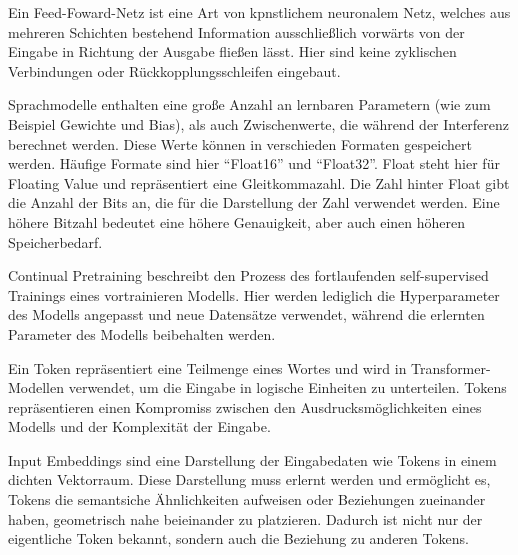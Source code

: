 \begin{definition}\label{def:feed-forward-netz}
    Ein Feed-Foward-Netz ist eine Art von kpnstlichem neuronalem Netz, welches aus mehreren Schichten bestehend Information ausschließlich vorwärts von der Eingabe
    in Richtung der Ausgabe fließen lässt. Hier sind keine zyklischen Verbindungen oder Rückkopplungsschleifen eingebaut.
\end{definition}

\begin{definition}[Parameterformate]\label{def:parameterformate}
    Sprachmodelle enthalten eine große Anzahl an lernbaren Parametern (wie zum Beispiel Gewichte und Bias), als auch
    Zwischenwerte, die während der Interferenz berechnet werden. Diese Werte können in verschieden Formaten gespeichert werden.
    Häufige Formate sind hier \enquote{Float16} und \enquote{Float32}. Float steht hier für Floating Value und repräsentiert eine Gleitkommazahl.
    Die Zahl hinter Float gibt die Anzahl der Bits an, die für die Darstellung der Zahl verwendet werden.
    Eine höhere Bitzahl bedeutet eine höhere Genauigkeit, aber auch einen höheren Speicherbedarf.
\end{definition}

\begin{definition}\label{def:continual-pretraining}
    Continual Pretraining beschreibt den Prozess des fortlaufenden self-supervised Trainings eines vortrainieren Modells.
    Hier werden lediglich die Hyperparameter des Modells angepasst und neue Datensätze verwendet, während die erlernten Parameter des Modells beibehalten werden.
\end{definition}

\begin{definition}[Token]\label{def:token}
    Ein Token repräsentiert eine Teilmenge eines Wortes und wird in Transformer-Modellen verwendet, um die Eingabe in logische Einheiten zu unterteilen.
    Tokens repräsentieren einen Kompromiss zwischen den Ausdrucksmöglichkeiten eines Modells und der Komplexität der Eingabe.
\end{definition}

\begin{definition}\label{def:input-embeddings}
    Input Embeddings sind eine Darstellung der Eingabedaten wie Tokens in einem dichten Vektorraum.
    Diese Darstellung muss erlernt werden und ermöglicht es,
    Tokens die semantsiche Ähnlichkeiten aufweisen oder Beziehungen zueinander haben, geometrisch nahe beieinander zu platzieren.
    Dadurch ist nicht nur der eigentliche Token bekannt, sondern auch die Beziehung zu anderen Tokens.
\end{definition}

